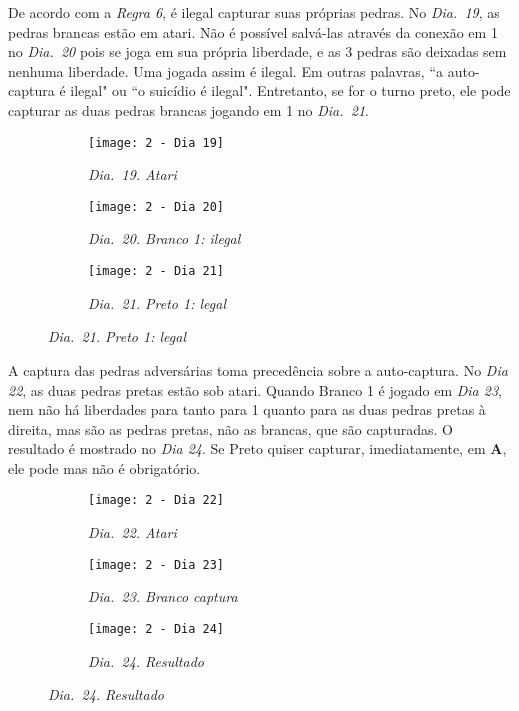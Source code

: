 \pagebreak

De acordo com a \emph{Regra 6}, é ilegal capturar suas próprias pedras. No \emph{Dia.\@~19}, as pedras brancas estão em atari. Não é possível salvá-las através da conexão em 1 no \emph{Dia.\@~20} pois se joga em sua própria liberdade, e as 3 pedras são deixadas sem nenhuma liberdade. Uma jogada assim é ilegal. Em outras palavras, ``a auto-captura é ilegal" ou ``o suicídio é ilegal". Entretanto, se for o turno preto, ele pode capturar as duas pedras brancas jogando em 1 no \emph{Dia.\@~21}.

\begin{figure}[h]
    \centering
    \begin{subfigure}[t]{.3\textwidth}
        \centering
        \texttt{[image: 2 - Dia 19]}
        \caption*{\emph{Dia.\@~19. Atari}}
    \end{subfigure}
    \begin{subfigure}[t]{.3\textwidth}
        \centering
        \texttt{[image: 2 - Dia 20]}
        \caption*{\emph{Dia.\@~20. Branco 1: ilegal}}
    \end{subfigure}
    \begin{subfigure}[t]{.3\textwidth}
        \centering
        \texttt{[image: 2 - Dia 21]}
        \caption*{\emph{Dia.\@~21. Preto 1: legal}}
    \end{subfigure}
\end{figure}

A captura das pedras adversárias toma precedência sobre a auto-captura. No \emph{Dia 22}, as duas pedras pretas estão sob atari. Quando Branco 1 é jogado em \emph{Dia 23}, nem não há liberdades para tanto para 1 quanto para as duas pedras pretas à direita, mas são as pedras pretas, não as brancas, que são capturadas. O resultado é mostrado no \emph{Dia 24}. Se Preto quiser capturar, imediatamente, em \textbf{A}, ele pode mas não é obrigatório.

\begin{figure}[h]
    \centering
    \begin{subfigure}[t]{.3\textwidth}
        \centering
        \texttt{[image: 2 - Dia 22]}
        \caption*{\emph{Dia.\@~22. Atari}}
    \end{subfigure}
    \begin{subfigure}[t]{.3\textwidth}
        \centering
        \texttt{[image: 2 - Dia 23]}
        \caption*{\emph{Dia.\@~23. Branco captura}}
    \end{subfigure}
    \begin{subfigure}[t]{.3\textwidth}
        \centering
        \texttt{[image: 2 - Dia 24]}
        \caption*{\emph{Dia.\@~24. Resultado}}
    \end{subfigure}
\end{figure}

